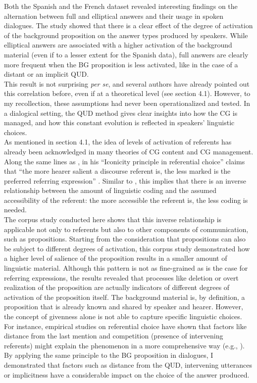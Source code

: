 Both the Spanish and the French dataset revealed interesting findings on the alternation between full and elliptical answers and their usage in spoken dialogues. The study showed that there is a clear effect of the degree of activation of the background proposition on the answer types produced by speakers. While elliptical answers are associated with a higher activation of the background material (even if to a lesser extent for the Spanish data), full answers are clearly more frequent when the BG proposition is less activated, like in the case of a distant or an implicit QUD.\\
This result is not surprising \textit{per se}, and several authors have already pointed out this correlation before, even if at a theoretical level (see section 4.1). However, to my recollection, these assumptions had never been operationalized and tested. In a dialogical setting, the QUD method gives clear insights into how the CG is managed, and how this constant evolution is reflected in speakers' linguistic choices. \\
As mentioned in section 4.1, the idea of levels of activation of referents has already been acknowledged in many theories of CG content and CG management. Along the same lines as \textcite{ariel2001accessibility}, \textcite{chiarcos2011mental} in his ``Iconicity principle in referential choice” claims that ``the  more  hearer  salient  a  discourse  referent  is,  the  less  marked  is  the  preferred referring expression” \parencite[201]{chiarcos2011mental}. Similar to \textcite{ariel2001accessibility}, this implies that there is an inverse relationship between the amount of linguistic coding and the assumed accessibility of the referent: the more accessible the  referent  is,  the  less  coding  is  needed. \\
The corpus study conducted here shows that this inverse relationship is applicable not only to referents but also to other components of communication, such as propositions. Starting from the consideration that propositions can also be subject to different degrees of activation, this corpus study demonstrated how a higher level of salience of the proposition results in a smaller amount of linguistic material. Although this pattern is not as fine-grained as is the case for referring expressions, the results revealed that processes like deletion or overt realization of the proposition are actually indicators of different degrees of activation of the proposition itself. 
The background material is, by definition, a proposition that is already known and shared by speaker and hearer. However, the concept of givenness alone is not able to capture specific linguistic choices. For instance, empirical studies on referential choice  have shown that factors like distance from the last mention and competition (presence of intervening referents) might explain the phenomenon in a more comprehensive way (e.g., \cite{arnold2007effect}).
By applying the same principle to the BG proposition in dialogues, I demonstrated that factors such as distance from the QUD, intervening utterances or implicitness have a considerable impact on the choice of the answer produced.

